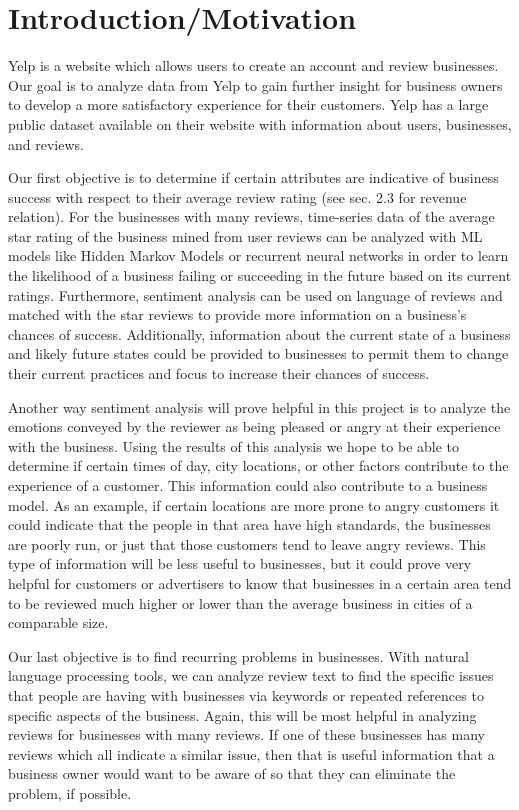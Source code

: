 
\section{Introduction/Motivation}

\quad Yelp is a website which allows users to create an account and review businesses. Our goal is to analyze data from Yelp to gain further insight for business owners to develop a more satisfactory experience for their customers. Yelp has a large public dataset available on their website with information about users, businesses, and reviews.

\quad Our first objective is to determine if certain attributes are indicative of business success with respect to their average review rating (see sec. 2.3 for revenue relation). For the businesses with many reviews, time-series data of the average star rating of the business mined from user reviews can be analyzed with ML models like Hidden Markov Models or recurrent neural networks in order to learn the likelihood of a business failing or succeeding in the future based on its current ratings. Furthermore, sentiment analysis can be used on language of reviews and matched with the star reviews to provide more information on a business's chances of success. Additionally, information about the current state of a business and likely future states could be provided to businesses to permit them to change their current practices and focus to increase their chances of success.

\quad Another way sentiment analysis will prove helpful in this project is to analyze the emotions conveyed by the reviewer as being pleased or angry at their experience with the business. Using the results of this analysis we hope to be able to determine if certain times of day, city locations, or other factors contribute to the experience of a customer. This information could also contribute to a business model. As an example, if certain locations are more prone to angry customers it could indicate that the people in that area have high standards, the businesses are poorly run, or just that those customers tend to leave angry reviews. This type of information will be less useful to businesses, but it could prove very helpful for customers or advertisers to know that businesses in a certain area tend to be reviewed much higher or lower than the average business in cities of a comparable size.

\quad Our last objective is to find recurring problems in businesses. With natural language processing tools, we can analyze review text to find the specific issues that people are having with businesses via keywords or repeated references to specific aspects of the business. Again, this will be most helpful in analyzing reviews for businesses with many reviews. If one of these businesses has many reviews which all indicate a similar issue, then that is useful information that a business owner would want to be aware of so that they can eliminate the problem, if possible.

